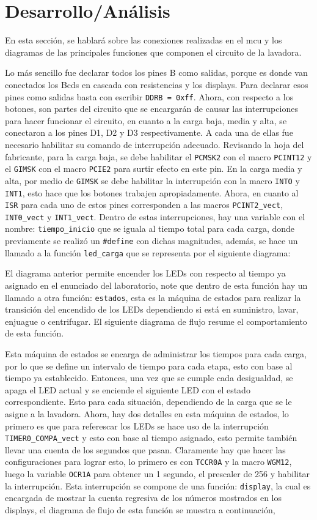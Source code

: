 \section{Desarrollo/Análisis}
En esta sección, se hablará sobre las conexiones realizadas en el mcu y los diagramas de las principales funciones que componen el circuito de la lavadora.\par
Lo más sencillo fue declarar todos los pines B como salidas, porque es donde van conectados los Bcds en cascada con resistencias y los displays. Para declarar esos pines como salidas basta con escribir \texttt{DDRB = 0xff}. Ahora, con respecto a los botones, son partes del circuito que se encargarán de causar las interrupciones para hacer funcionar el circuito, en cuanto a la carga baja, media y alta, se conectaron a los pines D1, D2 y D3 respectivamente. A cada una de ellas fue necesario habilitar su comando de interrupción adecuado. Revisando la hoja del fabricante, para la carga baja, se debe habilitar el \texttt{PCMSK2} con el macro \texttt{PCINT12} y el \texttt{GIMSK} con el macro \texttt{PCIE2} para surtir efecto en este pin. En la carga media y alta, por medio de \texttt{GIMSK} se debe habilitar la interrupción con la macro \texttt{INTO} y \texttt{INT1}, esto hace que los botones trabajen apropiadamente. Ahora, en cuanto al \texttt{ISR} para cada uno de estos pines corresponden a las macros \texttt{PCINT2\_vect}, \texttt{INT0\_vect} y \texttt{INT1\_vect}. Dentro de estas interrupciones, hay una variable con el nombre: \texttt{tiempo\_inicio} que se iguala al tiempo total para cada carga, donde previamente se realizó un \texttt{\#define} con dichas magnitudes, además, se hace un llamado a la función \texttt{led\_carga} que se representa por el siguiente diagrama:

El diagrama anterior permite encender los LEDs con respecto al tiempo ya asignado en el enunciado del laboratorio, note que dentro de esta función hay un llamado a otra función: \texttt{estados}, esta es la máquina de estados para realizar la transición del encendido de los LEDs dependiendo si está en suministro, lavar, enjuague o centrifugar. El siguiente diagrama de flujo resume el comportamiento de esta función.


Esta máquina de estados se encarga de administrar los tiempos para cada carga, por lo que se define un intervalo de tiempo para cada etapa, esto con base al tiempo ya establecido. Entonces, una vez que se cumple cada desigualdad, se apaga el LED actual y se enciende el siguiente LED con el estado correspondiente. Esto para cada situación, dependiendo de la carga que se le asigne a la lavadora. Ahora, hay dos detalles en esta máquina de estados, lo primero es que para referescar los LEDs se hace uso de la interrupción \texttt{TIMER0\_COMPA\_vect} y esto con base al tiempo asignado, esto permite también llevar una cuenta de los segundos que pasan. Claramente hay que hacer las configuraciones para lograr esto, lo primero es con  \texttt{TCCR0A} y la macro \texttt{WGM12}, luego la variable \texttt{OCR1A} para obtener un 1 segundo, el prescaler de 256 y habilitar la interrupción. Esta interrupción se compone de una función: \texttt{display}, la cual es encargada de mostrar la cuenta regresiva de los números mostrados en los displays, el diagrama de flujo de esta función se muestra a continuación,
